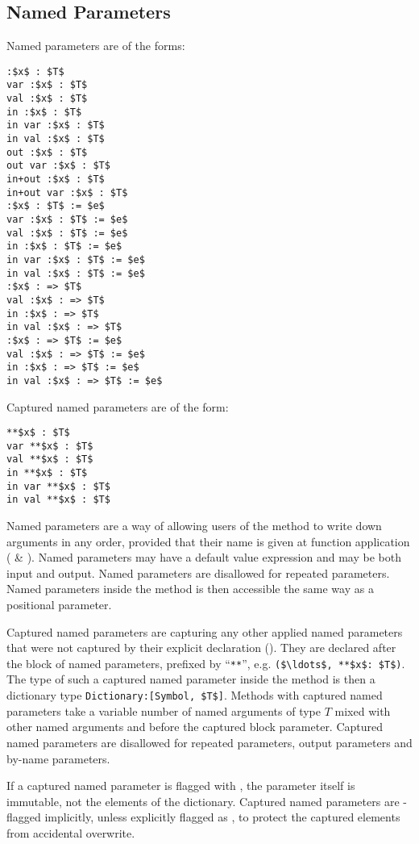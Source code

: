\subsection{Named Parameters}
\label{sec:named-parameters}
\label{sec:captured-named-parameters}

Named parameters are of the forms:
\begin{lstlisting}
:$x$ : $T$
var :$x$ : $T$
val :$x$ : $T$
in :$x$ : $T$
in var :$x$ : $T$
in val :$x$ : $T$
out :$x$ : $T$
out var :$x$ : $T$
in+out :$x$ : $T$
in+out var :$x$ : $T$
:$x$ : $T$ := $e$
var :$x$ : $T$ := $e$
val :$x$ : $T$ := $e$
in :$x$ : $T$ := $e$
in var :$x$ : $T$ := $e$
in val :$x$ : $T$ := $e$
:$x$ : => $T$
val :$x$ : => $T$
in :$x$ : => $T$
in val :$x$ : => $T$
:$x$ : => $T$ := $e$
val :$x$ : => $T$ := $e$
in :$x$ : => $T$ := $e$
in val :$x$ : => $T$ := $e$
\end{lstlisting}

Captured named parameters are of the form: 
\begin{lstlisting}
**$x$ : $T$
var **$x$ : $T$
val **$x$ : $T$
in **$x$ : $T$
in var **$x$ : $T$
in val **$x$ : $T$
\end{lstlisting}

Named parameters are a way of allowing users of the method to write down arguments in any order, provided that their name is given at function application ( \& ). Named parameters may have a default value expression and may be both input and output. Named parameters are disallowed for repeated parameters. Named parameters inside the method is then accessible the same way as a positional parameter. 

Captured named parameters are capturing any other applied named parameters that were not captured by their explicit declaration (). They are declared after the block of named parameters, prefixed by ``\lstinline!**!'', e.g. \lstinline!($\ldots$, **$x$: $T$)!. The type of such a captured named parameter inside the method is then a dictionary type \lstinline!Dictionary:[Symbol, $T$]!. Methods with captured named parameters take a variable number of named arguments of type $T$ mixed with other named arguments and before the captured block parameter. Captured named parameters are disallowed for repeated parameters, output parameters and by-name parameters. 

If a captured named parameter is flagged with , the parameter itself is immutable, not the elements of the dictionary. Captured named parameters are -flagged implicitly, unless explicitly flagged as , to protect the captured elements from accidental overwrite. 


